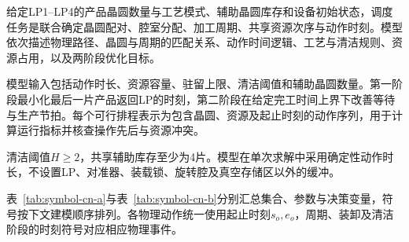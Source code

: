 \documentclass[final,5p,times,twocolumn]{elsarticle}
\begin{document}
给定LP1--LP4的产品晶圆数量与工艺模式、辅助晶圆库存和设备初始状态，调度任务是联合确定晶圆配对、腔室分配、加工周期、共享资源次序与动作时刻。模型依次描述物理路径、晶圆与周期的匹配关系、动作时间逻辑、工艺与清洁规则、资源占用，以及两阶段优化目标。

模型输入包括动作时长、资源容量、驻留上限、清洁阈值和辅助晶圆数量。第一阶段最小化最后一片产品返回LP的时刻，第二阶段在给定完工时间上界下改善等待与生产节拍。每个可行排程表示为包含晶圆、资源及起止时刻的动作序列，用于计算运行指标并核查操作先后与资源冲突。

清洁阈值$H\ge2$，共享辅助库存至少为4片。模型在单次求解中采用确定性动作时长，不设置LP、对准器、装载锁、旋转腔及真空存储区以外的缓冲。

表~\ref{tab:symbol-cn-a}与表~\ref{tab:symbol-cn-b}分别汇总集合、参数与决策变量，符号按下文建模顺序排列。各物理动作统一使用起止时刻$s_o,e_o$，周期、装卸及清洁阶段的时刻符号对应相应物理事件。
\end{document}
